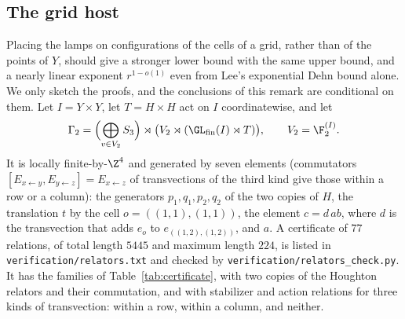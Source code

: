 \subsection{The grid host}\label{sec:grid}

\begin{remark}\label{rem:grid}
Placing the lamps on configurations of the cells of a grid, rather than of the points of $Y$, should give a stronger lower bound with the same upper
bound, and a nearly linear exponent $r^{1-o(1)}$ even from Lee's exponential Dehn bound alone. We only sketch the proofs, and the conclusions of this remark are conditional on them. Let $I=Y\times Y$, let $T=H\times H$ act on $I$ coordinatewise, and let
\[
\Gamma_2=\Bigl(\bigoplus_{v\in V_2}S_3\Bigr)\rtimes\bigl(V_2\rtimes(\GL_{\rm fin}(I)\rtimes T)\bigr),\qquad V_2=\F_2^{(I)} .
\]
It is locally finite-by-$\Z^4$ and generated by seven elements (commutators $[E_{x\leftarrow y},E_{y\leftarrow z}]=E_{x\leftarrow z}$ of
transvections of the third kind give those within a row or a column): the generators $p_1,q_1,p_2,q_2$ of the two copies of $H$, the translation $t$ by
the cell $o=((1,1),(1,1))$, the element $c=d\,ab$, where $d$ is the transvection that adds $e_o$ to $e_{((1,2),(1,2))}$, and $a$. A certificate of
$77$ relations, of total length $5445$ and maximum length $224$, is listed in \texttt{verification/relators.txt} and checked by
\texttt{verification/relators\_check.py}. It has the families of Table~\ref{tab:certificate}, with two copies of the Houghton relators and
their commutation, and with stabilizer and action relations for three kinds of transvection: within a row, within a column, and neither.


\end{remark}
